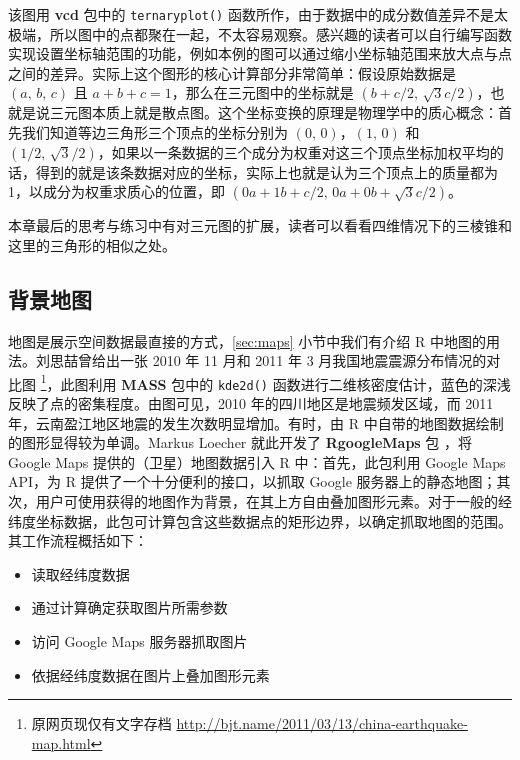\documentclass[
  b5paper,
  UTF8,twoside]{book}
\providecommand{\tightlist}{%
  \setlength{\itemsep}{0pt}\setlength{\parskip}{0pt}}
\begin{document}
该图用 \textbf{vcd} 包中的 \texttt{ternaryplot()} 函数所作，由于数据中的成分数值差异不是太极端，所以图中的点都聚在一起，不太容易观察。感兴趣的读者可以自行编写函数实现设置坐标轴范围的功能，例如本例的图可以通过缩小坐标轴范围来放大点与点之间的差异。实际上这个图形的核心计算部分非常简单：假设原始数据是 \((a,\,b,\,c)\) 且 \(a+b+c=1\)，那么在三元图中的坐标就是 \((b+c/2,\,\sqrt{3}c/2)\)，也就是说三元图本质上就是散点图。这个坐标变换的原理是物理学中的质心概念：首先我们知道等边三角形三个顶点的坐标分别为 \((0,\,0)\)，\((1,\,0)\) 和 \((1/2,\,\sqrt{3}/2)\)，如果以一条数据的三个成分为权重对这三个顶点坐标加权平均的话，得到的就是该条数据对应的坐标，实际上也就是认为三个顶点上的质量都为 1，以成分为权重求质心的位置，即 \((0a+1b+c/2,\,0a+0b+\sqrt{3}c/2)\)。

本章最后的思考与练习中有对三元图的扩展，读者可以看看四维情况下的三棱锥和这里的三角形的相似之处。

\hypertarget{ux80ccux666fux5730ux56fe}{%
\subsection{背景地图}\label{ux80ccux666fux5730ux56fe}}

地图是展示空间数据最直接的方式，\ref{sec:maps} 小节中我们有介绍 R 中地图的用法。刘思喆曾给出一张 2010 年 11 月和 2011 年 3 月我国地震震源分布情况的对比图 \footnote{原网页现仅有文字存档 \url{http://bjt.name/2011/03/13/china-earthquake-map.html}}，此图利用 \textbf{MASS} 包中的 \texttt{kde2d()} 函数进行二维核密度估计，蓝色的深浅反映了点的密集程度。由图可见，2010 年的四川地区是地震频发区域，而 2011 年，云南盈江地区地震的发生次数明显增加。有时，由 R 中自带的地图数据绘制的图形显得较为单调。Markus Loecher 就此开发了 \textbf{RgoogleMaps} 包 \citep{RgoogleMaps}，将 Google Maps 提供的（卫星）地图数据引入 R 中：首先，此包利用 Google Maps API，为 R 提供了一个十分便利的接口，以抓取 Google 服务器上的静态地图；其次，用户可使用获得的地图作为背景，在其上方自由叠加图形元素。对于一般的经纬度坐标数据，此包可计算包含这些数据点的矩形边界，以确定抓取地图的范围。其工作流程概括如下：

\begin{itemize}
\tightlist
\item
  读取经纬度数据
\item
  通过计算确定获取图片所需参数
\item
  访问 Google Maps 服务器抓取图片
\item
  依据经纬度数据在图片上叠加图形元素
\end{itemize}
\end{document}
